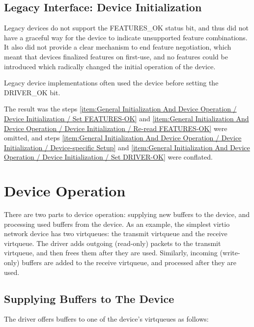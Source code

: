 \subsection{Legacy Interface: Device Initialization}\label{sec:General Initialization And Device Operation / Device Initialization / Legacy Interface: Device Initialization}
Legacy devices do not support the FEATURES_OK status bit, and thus did
not have a graceful way for the device to indicate unsupported feature
combinations.  It also did not provide a clear mechanism to end
feature negotiation, which meant that devices finalized features on
first-use, and no features could be introduced which radically changed
the initial operation of the device.

Legacy device implementations often used the device before setting the
DRIVER_OK bit.

The result was the steps \ref{item:General Initialization And Device Operation / Device Initialization / Set FEATURES-OK} and \ref{item:General Initialization And Device Operation / Device Initialization / Re-read FEATURES-OK} were omitted, and steps \ref{item:General Initialization And Device Operation / Device Initialization / Device-specific Setup} and \ref{item:General Initialization And Device Operation / Device Initialization / Set DRIVER-OK}
were conflated.

\section{Device Operation}\label{sec:General Initialization And Device Operation / Device Operation}

There are two parts to device operation: supplying new buffers to
the device, and processing used buffers from the device. As an
example, the simplest virtio network device has two virtqueues: the
transmit virtqueue and the receive virtqueue. The driver adds
outgoing (read-only) packets to the transmit virtqueue, and then
frees them after they are used. Similarly, incoming (write-only)
buffers are added to the receive virtqueue, and processed after
they are used.

\subsection{Supplying Buffers to The Device}\label{sec:General Initialization And Device Operation / Device Operation / Supplying Buffers to The Device}

The driver offers buffers to one of the device's virtqueues as follows:

